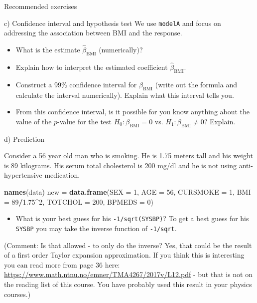 \documentclass[ignorenonframetext,]{beamer}
\newenvironment{Shaded}{\begin{snugshade}}{\end{snugshade}}
\newcommand{\KeywordTok}[1]{\textcolor[rgb]{0.13,0.29,0.53}{\textbf{#1}}}
\newcommand{\DataTypeTok}[1]{\textcolor[rgb]{0.13,0.29,0.53}{#1}}
\newcommand{\DecValTok}[1]{\textcolor[rgb]{0.00,0.00,0.81}{#1}}
\newcommand{\FloatTok}[1]{\textcolor[rgb]{0.00,0.00,0.81}{#1}}
\newcommand{\StringTok}[1]{\textcolor[rgb]{0.31,0.60,0.02}{#1}}
\newcommand{\OperatorTok}[1]{\textcolor[rgb]{0.81,0.36,0.00}{\textbf{#1}}}
\newcommand{\NormalTok}[1]{#1}
\providecommand{\tightlist}{%
  \setlength{\itemsep}{0pt}\setlength{\parskip}{0pt}}
\begin{document}
\begin{frame}[fragile]{Recommended exercises}
\begin{block}{c) Confidence interval and hypothesis test}
We use \texttt{modelA} and focus on addressing the association between
BMI and the response.

\begin{itemize}
\tightlist
\item
  What is the estimate \(\hat{\beta}_{\text{BMI}}\) (numerically)?
\item
  Explain how to interpret the estimated coefficient
  \(\hat{\beta}_{\text{BMI}}\).
\item
  Construct a 99\% confidence interval for \(\beta_{\text{BMI}}\) (write
  out the formula and calculate the interval numerically). Explain what
  this interval tells you.
\item
  From this confidence interval, is it possible for you know anything
  about the value of the \(p\)-value for the test
  \(H_0: \beta_{\text{BMI}}=0\) vs. \(H_1:\beta_{\text{BMI}} \neq 0\)?
  Explain.
\end{itemize}

\end{block}

\begin{block}{d) Prediction}

Consider a 56 year old man who is smoking. He is 1.75 meters tall and
his weight is 89 kilograms. His serum total cholesterol is 200 mg/dl and
he is not using anti-hypertensive medication.

\begin{Shaded}
\begin{Highlighting}[]
\KeywordTok{names}\NormalTok{(data)}
\NormalTok{new =}\StringTok{ }\KeywordTok{data.frame}\NormalTok{(}\DataTypeTok{SEX =} \DecValTok{1}\NormalTok{, }\DataTypeTok{AGE =} \DecValTok{56}\NormalTok{, }\DataTypeTok{CURSMOKE =} \DecValTok{1}\NormalTok{, }\DataTypeTok{BMI =} \DecValTok{89}\OperatorTok{/}\FloatTok{1.75}\OperatorTok{^}\DecValTok{2}\NormalTok{, }\DataTypeTok{TOTCHOL =} \DecValTok{200}\NormalTok{, }
    \DataTypeTok{BPMEDS =} \DecValTok{0}\NormalTok{)}
\end{Highlighting}
\end{Shaded}

\begin{itemize}
\tightlist
\item
  What is your best guess for his \texttt{-1/sqrt(SYSBP)}? To get a best
  guess for his \texttt{SYSBP} you may take the inverse function of
  \texttt{-1/sqrt}.
\end{itemize}

(Comment: Is that allowed - to only do the inverse? Yes, that could be
the result of a first order Taylor expansion approximation. If you think
this is interesting you can read more from page 36 here:
\url{https://www.math.ntnu.no/emner/TMA4267/2017v/L12.pdf} - but that is
not on the reading list of this course. You have probably used this
result in your physics courses.)


\end{block}
\end{frame}
\end{document}
